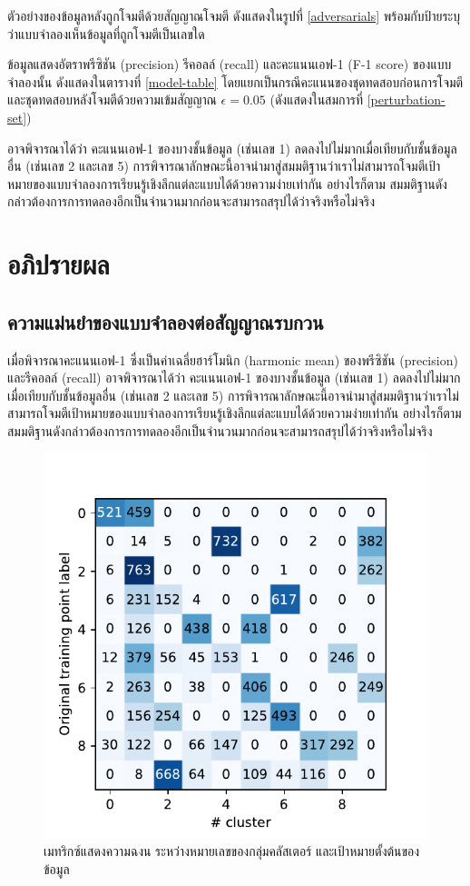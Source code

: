 \documentclass{cpepaper}
\begin{document}
ตัวอย่างของข้อมูลหลังถูกโจมตีด้วยสัญญาณโจมตี ดังแสดงในรูปที่ \ref{adversarials} พร้อมกับป้ายระบุว่าแบบจำลองเห็นข้อมูลที่ถูกโจมตีเป็นเลขใด

ข้อมูลแสดงอัตราพรีซิชัน (precision) รีคอลล์ (recall) และคะแนนเอฟ-1 (F-1 score) ของแบบจำลองนั้น ดังแสดงในตารางที่ \ref{model-table} โดยแยกเป็นกรณีคะแนนของชุดทดสอบก่อนการโจมตี และชุดทดสอบหลังโจมตีด้วยความเข้มสัญญาณ $\epsilon = 0.05$ (ดังแสดงในสมการที่ \ref{perturbation-set})

อาจพิจารณาได้ว่า คะแนนเอฟ-1 ของบางชั้นข้อมูล (เช่นเลข 1) ลดลงไปไม่มากเมื่อเทียบกับชั้นข้อมูลอื่น (เช่นเลข 2 และเลข 5) การพิจารณาลักษณะนี้อาจนำมาสู่สมมติฐานว่าเราไม่สามารถโจมตีเป้าหมายของแบบจำลองการเรียนรู้เชิงลึกแต่ละแบบได้ด้วยความง่ายเท่ากัน อย่างไรก็ตาม สมมติฐานดังกล่าวต้องการการทดลองอีกเป็นจำนวนมากก่อนจะสามารถสรุปได้ว่าจริงหรือไม่จริง

\section{อภิปรายผล}

\subsection{ความแม่นยำของแบบจำลองต่อสัญญาณรบกวน}

เมื่อพิจารณาคะแนนเอฟ-1 ซึ่งเป็นค่าเฉลี่ยฮาร์โมนิก (harmonic mean) ของพรีซิชัน (precision) และรีคอลล์ (recall) อาจพิจารณาได้ว่า คะแนนเอฟ-1 ของบางชั้นข้อมูล (เช่นเลข 1) ลดลงไปไม่มากเมื่อเทียบกับชั้นข้อมูลอื่น (เช่นเลข 2 และเลข 5) การพิจารณาลักษณะนี้อาจนำมาสู่สมมติฐานว่าเราไม่สามารถโจมตีเป้าหมายของแบบจำลองการเรียนรู้เชิงลึกแต่ละแบบได้ด้วยความง่ายเท่ากัน อย่างไรก็ตาม สมมติฐานดังกล่าวต้องการการทดลองอีกเป็นจำนวนมากก่อนจะสามารถสรุปได้ว่าจริงหรือไม่จริง

\begin{figure}
    \centering
    \includegraphics[width=\columnwidth]{images/original-cf.pdf}
    \caption{เมทริกซ์แสดงความฉงน ระหว่างหมายเลขของกลุ่มคลัสเตอร์ และเป้าหมายตั้งต้นของข้อมูล}
    \label{original-cf}
\end{figure}
\end{document}
